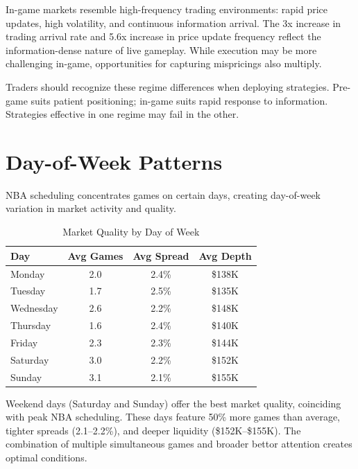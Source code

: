 In-game markets resemble high-frequency trading environments: rapid price updates, high volatility, and continuous information arrival. The 3x increase in trading arrival rate and 5.6x increase in price update frequency reflect the information-dense nature of live gameplay. While execution may be more challenging in-game, opportunities for capturing mispricings also multiply.

Traders should recognize these regime differences when deploying strategies. Pre-game suits patient positioning; in-game suits rapid response to information. Strategies effective in one regime may fail in the other.

\section{Day-of-Week Patterns}

NBA scheduling concentrates games on certain days, creating day-of-week variation in market activity and quality.

\begin{table}[H]
\centering
\caption{Market Quality by Day of Week}
\label{tab:day-of-week}
\begin{tabular}{lccc}
\toprule
\textbf{Day} & \textbf{Avg Games} & \textbf{Avg Spread} & \textbf{Avg Depth} \\
\midrule
Monday & 2.0 & 2.4\% & \$138K \\
Tuesday & 1.7 & 2.5\% & \$135K \\
Wednesday & 2.6 & 2.2\% & \$148K \\
Thursday & 1.6 & 2.4\% & \$140K \\
Friday & 2.3 & 2.3\% & \$144K \\
Saturday & 3.0 & 2.2\% & \$152K \\
Sunday & 3.1 & 2.1\% & \$155K \\
\bottomrule
\end{tabular}
\end{table}

Weekend days (Saturday and Sunday) offer the best market quality, coinciding with peak NBA scheduling. These days feature 50\% more games than average, tighter spreads (2.1--2.2\%), and deeper liquidity (\$152K--\$155K). The combination of multiple simultaneous games and broader bettor attention creates optimal conditions.

